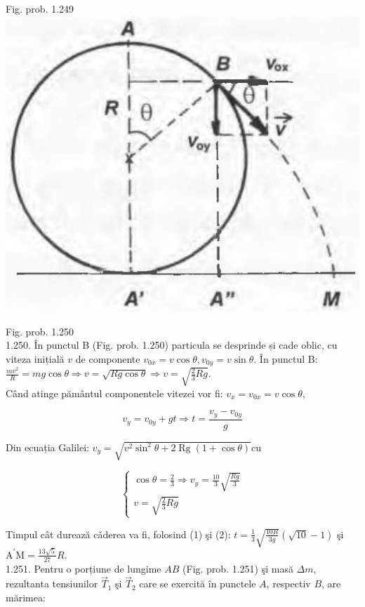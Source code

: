 \documentclass[10pt]{article}
\begin{document}
Fig. prob. 1.249\\
\includegraphics[max width=\textwidth, center]{2025_07_01_5b3ff9fa0d508c8e9f17g-250}

Fig. prob. 1.250\\
1.250. În punctul B (Fig. prob. 1.250) particula se desprinde și cade oblic, cu viteza inițială $v$ de componente $v_{0 x}=v \cos \theta, v_{0 y}=v \sin \theta$. În punctul B: $\frac{m v^{2}}{R}=m g \cos \theta \Rightarrow v=\sqrt{R g \cos \theta} \Rightarrow v=\sqrt{\frac{2}{3} R g}$.\\
Când atinge pământul componentele vitezei vor fi: $v_{x}=v_{0 x}=v \cos \theta$,


\begin{equation*}
v_{y}=v_{0 y}+g t \Rightarrow t=\frac{v_{y}-v_{0 y}}{g} \tag{1}
\end{equation*}


Din ecuația Galilei: $v_{y}=\sqrt{v^{2} \sin ^{2} \theta+2 \operatorname{Rg}(1+\cos \theta)} \mathrm{cu}$

\[
\left\{\begin{array}{l}
\cos \theta=\frac{2}{3} \Rightarrow v_{y}=\frac{10}{3} \sqrt{\frac{R g}{3}}  \tag{2}\\
v=\sqrt{\frac{2}{3} R g}
\end{array}\right.
\]

Timpul cât durează cǎderea va fi, folosind (1) şi (2): $t=\frac{1}{3} \sqrt{\frac{10 R}{3 g}}(\sqrt{10}-1)$ şi $\mathrm{A}^{\prime} \mathrm{M}=\frac{13 \sqrt{5}}{27} R$.\\
1.251. Pentru o porțiune de lungime $A B$ (Fig. prob. 1.251) şi masă $\Delta m$, rezultanta tensiunilor $\vec{T}_{1}$ şi $\vec{T}_{2}$ care se exercită în punctele $A$, respectiv $B$, are mărimea:
\end{document}
